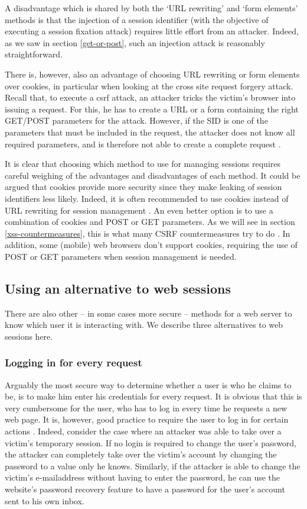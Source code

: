 A disadvantage which is shared by both the `URL rewriting' and `form elements' methods is that the injection of a session identifier (with the objective of executing a session fixation attack) requires little effort from an attacker. Indeed, as we saw in section \ref{get-or-post}, such an injection attack is reasonably straightforward.

There is, however, also an advantage of choosing URL rewriting or form elements over cookies, in particular when looking at the cross site request forgery attack. Recall that, to execute a \gls{csrf} attack, an attacker tricks the victim's browser into issuing a request. For this, he  has to create a URL or a form containing the right GET/POST parameters for the attack. However, if the SID is one of the parameters that must be included in the request, the attacker does not know all required parameters, and is therefore not able to create a complete request \cite{Johnston2004}.

It is clear that choosing which method to use for managing sessions requires careful weighing of the advantages and disadvantages of each method. It could be argued that cookies provide more security since they make leaking of session identifiers less likely. Indeed, it is often recommended to use cookies instead of URL rewriting for session management \cite{Zhong2006,Vamosi2006}. An even better option is to use a combination of cookies and POST or GET parameters. As we will see in section \ref{xss-countermeasures}, this is what many CSRF countermeasures try to do \cite{Jovanovic2006,Johns2006}. In addition, some (mobile) web browsers don't support cookies, requiring the use of POST or GET parameters when session management is needed.

\subsection{Using an alternative to web sessions}

There are also other -- in some cases more secure -- methods for a web server to know which user it is interacting with. We describe three alternatives to web sessions here.

\subsubsection{Logging in for every request}
Arguably the most secure way to determine whether a user is who he claims to be, is to make him enter his credentials for every request. It is obvious that this is very cumbersome for the user, who has to log in every time he requests a new web page. It is, however, good practice to require the user to log in for certain actions \cite{Webers2008}. Indeed, consider the case where an attacker was able to take over a victim's temporary session. If no login is required to change the user's password, the attacker can completely take over the victim's account by changing the password to a value only he knows. Similarly, if the attacker is able to change the victim's e-mailaddress without having to enter the password, he can use the website's password recovery feature to have a password for the user's account sent to his own inbox.

